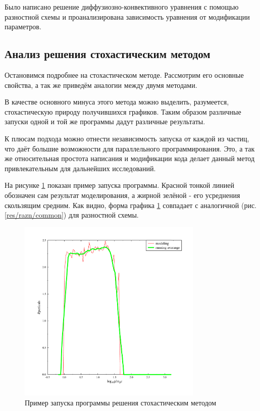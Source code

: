 \documentclass[a4paper,14pt]{extarticle} %
\begin{document}
Было написано решение диффузиозно-конвективного уравнения с помощью разностной схемы и проанализирована зависимость уравнения от модификации параметров.
\subsection{Анализ решения стохастическим методом}
Остановимся подробнее на стохастическом методе. Рассмотрим его основные свойства, а так же приведём аналогии между двумя методами.

В качестве основного минуса этого метода можно выделить, разумеется, стохастическую природу получившихся графиков. Таким образом различные запуски одной и той же программы дадут различные результаты.

К плюсам подхода можно отнести независимость запуска от каждой из частиц, что даёт большие возможности для параллельного программирования. Это, а так же относительная простота написания и модификации кода делает данный метод привлекательным для дальнейших исследований.

На рисунке \ref{res/stoh/common} показан пример запуска программы. Красной тонкой линией обозначен сам результат моделирования, а жирной зелёной - его усреднения скользящим средним. Как видно, форма графика \ref{res/stoh/common} совпадает с аналогичной (рис.  \ref{res/razn/common}) для разностной схемы.

\begin{figure}[H]
\centering
\includegraphics[width=250pt]{stoh_bom_one}
\caption{Пример запуска программы решения стохастическим методом}
\label{res/stoh/common}
\end{figure}
\end{document}
